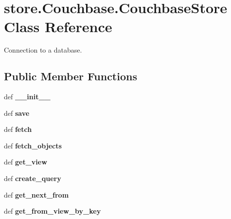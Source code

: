 \hypertarget{classstore_1_1_couchbase_1_1_couchbase_store}{\section{store.\-Couchbase.\-Couchbase\-Store Class Reference}
\label{classstore_1_1_couchbase_1_1_couchbase_store}
}


Connection to a database.  


\subsection*{Public Member Functions}
\begin{DoxyCompactItemize}
\item 
\hypertarget{classstore_1_1_couchbase_1_1_couchbase_store_ab9cd30b7b285ed17ffe1ed63d9bcdfae}{def {\bfseries \-\_\-\-\_\-init\-\_\-\-\_\-}}\label{classstore_1_1_couchbase_1_1_couchbase_store_ab9cd30b7b285ed17ffe1ed63d9bcdfae}

\item 
\hypertarget{classstore_1_1_couchbase_1_1_couchbase_store_ac623c3f05998fe381a935eb5cc0bc7dc}{def {\bfseries save}}\label{classstore_1_1_couchbase_1_1_couchbase_store_ac623c3f05998fe381a935eb5cc0bc7dc}

\item 
\hypertarget{classstore_1_1_couchbase_1_1_couchbase_store_af2575b7c0b3f5e4ad67aece3db61eeb8}{def {\bfseries fetch}}\label{classstore_1_1_couchbase_1_1_couchbase_store_af2575b7c0b3f5e4ad67aece3db61eeb8}

\item 
\hypertarget{classstore_1_1_couchbase_1_1_couchbase_store_ada63cb7a5adea1ec5948f320d935c2f9}{def {\bfseries fetch\-\_\-objects}}\label{classstore_1_1_couchbase_1_1_couchbase_store_ada63cb7a5adea1ec5948f320d935c2f9}

\item 
\hypertarget{classstore_1_1_couchbase_1_1_couchbase_store_a7bceacebc4e938731799131481f284a7}{def {\bfseries get\-\_\-view}}\label{classstore_1_1_couchbase_1_1_couchbase_store_a7bceacebc4e938731799131481f284a7}

\item 
\hypertarget{classstore_1_1_couchbase_1_1_couchbase_store_ab68532a441d4d084c1adb1bec8c6bfd5}{def {\bfseries create\-\_\-query}}\label{classstore_1_1_couchbase_1_1_couchbase_store_ab68532a441d4d084c1adb1bec8c6bfd5}

\item 
\hypertarget{classstore_1_1_couchbase_1_1_couchbase_store_a59cbb774192cea135b6a82d684ba9de5}{def {\bfseries get\-\_\-next\-\_\-from}}\label{classstore_1_1_couchbase_1_1_couchbase_store_a59cbb774192cea135b6a82d684ba9de5}

\item 
\hypertarget{classstore_1_1_couchbase_1_1_couchbase_store_a09532a738370b6d28c6f4fdbb4308944}{def {\bfseries get\-\_\-from\-\_\-view\-\_\-by\-\_\-key}}\label{classstore_1_1_couchbase_1_1_couchbase_store_a09532a738370b6d28c6f4fdbb4308944}

\end{DoxyCompactItemize}
